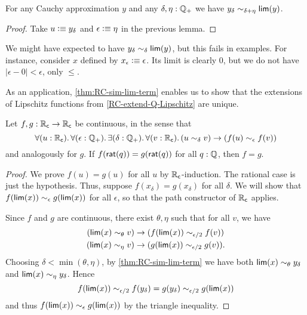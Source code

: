 \begin{lem}\label{thm:RC-sim-lim-term}
  For any Cauchy approximation $y$ and any $\delta,\eta:\mathbb{Q}_{+}$ we have $y_\delta \sim_{\delta+\eta} \mathsf{lim}(y)$.
\end{lem}
\begin{proof}
  Take $u\vcentcolon\equiv y_\delta$ and $\epsilon\vcentcolon\equiv \eta$ in the previous lemma.
\end{proof}

\begin{rmk}
  We might have expected to have $y_\delta \sim_{\delta} \mathsf{lim}(y)$, but this fails in examples.
  For instance, consider $x$ defined by $x_\epsilon \vcentcolon\equiv \epsilon$.
  Its limit is clearly $0$, but we do not have $|\epsilon - 0 |<\epsilon$, only $\le$.
\end{rmk}

As an application, \autoref{thm:RC-sim-lim-term} enables us to show that the extensions of Lipschitz functions from \autoref{RC-extend-Q-Lipschitz} are unique.

\begin{lem}\label{RC-continuous-eq}
  Let $f,g:\mathbb{R}_\mathsf{c}\to\mathbb{R}_\mathsf{c}$ be continuous, in the sense that
  \[ \fall{u:\RC}{\epsilon:\Qp}\exis{\delta:\Qp}\fall{v:\RC} (u\close\delta v) \to (f(u) \close\epsilon f(v)) \]
  and analogously for $g$.
  If $f(\mathsf{rat}(q))=g(\mathsf{rat}(q))$ for all $q:\mathbb{Q}$, then $f=g$.
\end{lem}
\begin{proof}
  We prove $f(u)=g(u)$ for all $u$ by $\mathbb{R}_\mathsf{c}$-induction.
  The rational case is just the hypothesis.
  Thus, suppose $f(x_\delta)=g(x_\delta)$ for all $\delta$.
  We will show that $f(\mathsf{lim}(x))\sim_{\epsilon} g(\mathsf{lim}(x))$ for all $\epsilon$, so that the path constructor of $\mathbb{R}_\mathsf{c}$ applies.

  Since $f$ and $g$ are continuous, there exist $\theta,\eta$ such that for all $v$, we have
  \begin{align*}
    (\mathsf{lim}(x)\sim_{\theta} v) &\to (f(\mathsf{lim}(x)) \sim_{\epsilon/2} f(v))\\
    (\mathsf{lim}(x)\sim_{\eta} v) &\to (g(\mathsf{lim}(x)) \sim_{\epsilon/2} g(v)).
  \end{align*}
  Choosing $\delta < \min(\theta,\eta)$, by \autoref{thm:RC-sim-lim-term} we have both $\mathsf{lim}(x)\sim_{\theta} y_\delta$ and $\mathsf{lim}(x)\sim_{\eta} y_\delta$.
  Hence
  \[ f(\mathsf{lim}(x)) \sim_{\epsilon/2} f(y_\delta) = g(y_\delta) \sim_{\epsilon/2} g(\mathsf{lim}(x))\]
  and thus $f(\mathsf{lim}(x))\sim_{\epsilon} g(\mathsf{lim}(x))$ by the triangle inequality.
\end{proof}

